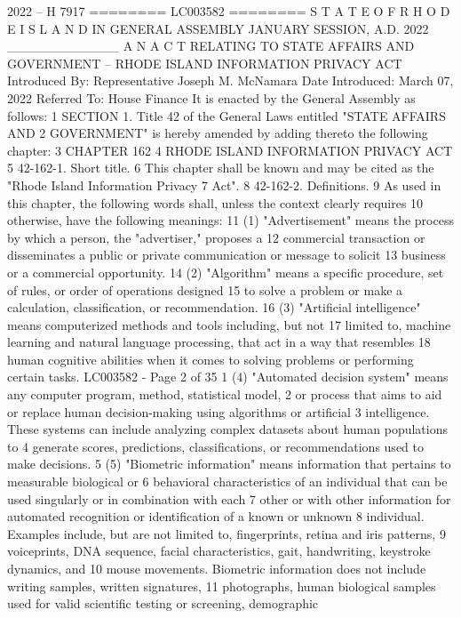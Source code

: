 2022 -- H 7917
========
LC003582
========
S T A T E O F R H O D E I S L A N D
IN GENERAL ASSEMBLY
JANUARY SESSION, A.D. 2022
____________
A N A C T
RELATING TO STATE AFFAIRS AND GOVERNMENT – RHODE ISLAND
INFORMATION PRIVACY ACT
Introduced By: Representative Joseph M. McNamara
Date Introduced: March 07, 2022
Referred To: House Finance
It is enacted by the General Assembly as follows:
1 SECTION 1. Title 42 of the General Laws entitled "STATE AFFAIRS AND
2 GOVERNMENT" is hereby amended by adding thereto the following chapter:
3 CHAPTER 162
4 RHODE ISLAND INFORMATION PRIVACY ACT
5 42-162-1. Short title.
6 This chapter shall be known and may be cited as the "Rhode Island Information Privacy
7 Act".
8 42-162-2. Definitions.
9 As used in this chapter, the following words shall, unless the context clearly requires
10 otherwise, have the following meanings:
11 (1) "Advertisement" means the process by which a person, the "advertiser," proposes a
12 commercial transaction or disseminates a public or private communication or message to solicit
13 business or a commercial opportunity.
14 (2) "Algorithm" means a specific procedure, set of rules, or order of operations designed
15 to solve a problem or make a calculation, classification, or recommendation.
16 (3) "Artificial intelligence" means computerized methods and tools including, but not
17 limited to, machine learning and natural language processing, that act in a way that resembles
18 human cognitive abilities when it comes to solving problems or performing certain tasks.
LC003582 - Page 2 of 35
1 (4) "Automated decision system" means any computer program, method, statistical model,
2 or process that aims to aid or replace human decision-making using algorithms or artificial
3 intelligence. These systems can include analyzing complex datasets about human populations to
4 generate scores, predictions, classifications, or recommendations used to make decisions.
5 (5) "Biometric information" means information that pertains to measurable biological or
6 behavioral characteristics of an individual that can be used singularly or in combination with each
7 other or with other information for automated recognition or identification of a known or unknown
8 individual. Examples include, but are not limited to, fingerprints, retina and iris patterns,
9 voiceprints, DNA sequence, facial characteristics, gait, handwriting, keystroke dynamics, and
10 mouse movements. Biometric information does not include writing samples, written signatures,
11 photographs, human biological samples used for valid scientific testing or screening, demographic
